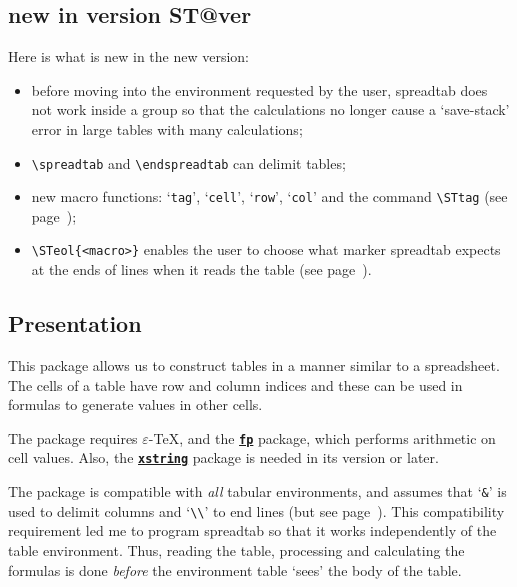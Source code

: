 \documentclass[a4paper,10pt]{article}
\newcommand\verbinline[1][]{\lstinline[breaklines=false,basicstyle=\normalsize\ttfamily,#1]}
\newcommand\ST{\textsf{spreadtab}\xspace}
\newcommand\falseverb[1]{\texttt{\detokenize{#1}}}
\begin{document}
\subsection{new in version \csname ST@ver\endcsname}
Here is what is new in the new version:
\begin{itemize}
	\item before moving into the environment requested by the user, \ST does not work inside a group so that the calculations no longer cause a `save-stack' error in large tables with many calculations;
	\item \verbinline-\spreadtab- and \verbinline-\endspreadtab- can delimit tables;
	\item new macro functions: `\verbinline-tag-', `\verbinline-cell-', `\verbinline-row-', `\verbinline-col-' and the command \verbinline-\STtag- (see page~\pageref{tag});
	\item \verbinline-\STeol{<macro>}- enables the user to choose what marker \ST expects at the ends of lines when it reads the table (see page~\pageref{STeol}).
\end{itemize}

\subsection{Presentation}
This package allows us to construct tables in a manner similar to a spreadsheet. The cells of a table have row and column indices and these can be used in formulas to generate values in other cells.

The package requires $\varepsilon$-\TeX, \LaTeXe{} and the \href{http://www.ctan.org/tex-archive/macros/latex/contrib/fp/}{\texttt{\textbf{fp}}} package, which performs arithmetic on cell values. Also, the \href{http://www.ctan.org/tex-archive/macros/latex/contrib/xstring/}{\texttt{\textbf{xstring}}} package is needed in its \falseverb{v1.5d [2010/03/28]} version or later.\medskip

The package is compatible with \emph{all} tabular environments, and assumes that `\verb=&=' is used to delimit columns and `\verb-\\-' to end lines (but see page~\pageref{STeol}). This  compatibility requirement led me to program \ST so that it works independently of the table environment. Thus, reading the table, processing and calculating the formulas is done \emph{before} the environment table `sees' the body of the table.\medskip
\end{document}
